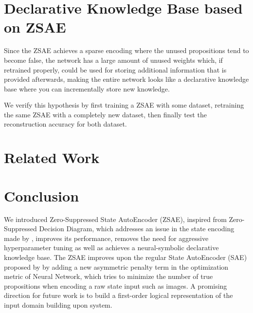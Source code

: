 \section{Declarative Knowledge Base based on ZSAE}

Since the ZSAE achieves a sparse encoding where the unused propositions
tend to become false, the network has a large amount of unused weights
which, if retrained properly, could be used for storing additional
information that is provided afterwards, making the entire network looks
like a declarative knowledge base where you can incrementally store
new knowledge.

We verify this hypothesis by first training a ZSAE with some dataset, retraining the same ZSAE with
a completely new dataset, then finally test the reconstruction accuracy for both dataset.

\section{Related Work}






\section{Conclusion}

We introduced Zero-Suppressed State AutoEncoder (ZSAE), inspired from
Zero-Suppressed Decision Diagram, which addresses an issue in the state
encoding made by \latentplanner, improves its performance, removes the need
for aggressive hyperparameter tuning as well as achieves a
neural-symbolic declarative knowledge base.  The ZSAE improves upon the
regular State AutoEncoder (SAE) proposed by \citeauthor{Asai2018} by
adding a new asymmetric penalty term in the optimization metric of
Neural Network, which tries to minimize the number of true propositions
when encoding a raw state input such as images.
A promising direction for future work is to build a first-order logical
representation of the input domain building upon \latentplanner system.
